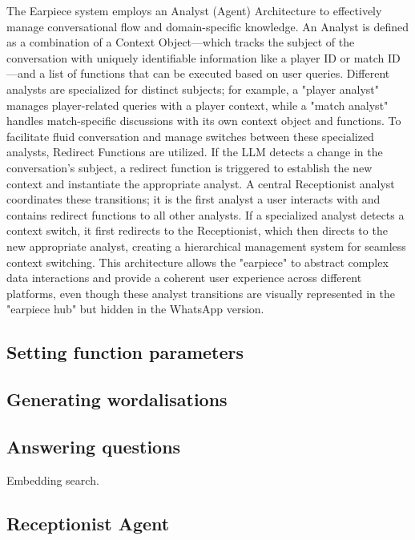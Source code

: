 \documentclass{article}
\begin{document}
The Earpiece system employs an Analyst (Agent) Architecture to effectively manage conversational flow and domain-specific knowledge. An Analyst is defined as a combination of a Context Object—which tracks the subject of the conversation with uniquely identifiable information like a player ID or match ID—and a list of functions that can be executed based on user queries. Different analysts are specialized for distinct subjects; for example, a "player analyst" manages player-related queries with a player context, while a "match analyst" handles match-specific discussions with its own context object and functions. To facilitate fluid conversation and manage switches between these specialized analysts, Redirect Functions are utilized. If the LLM detects a change in the conversation's subject, a redirect function is triggered to establish the new context and instantiate the appropriate analyst. A central Receptionist analyst coordinates these transitions; it is the first analyst a user interacts with and contains redirect functions to all other analysts. If a specialized analyst detects a context switch, it first redirects to the Receptionist, which then directs to the new appropriate analyst, creating a hierarchical management system for seamless context switching. This architecture allows the "earpiece" to abstract complex data interactions and provide a coherent user experience across different platforms, even though these analyst transitions are visually represented in the "earpiece hub" but hidden in the WhatsApp version.

\subsection{Setting function parameters}


\subsection{Generating wordalisations}

\subsection{Answering questions}

Embedding search.

\subsection{Receptionist Agent}
\end{document}
